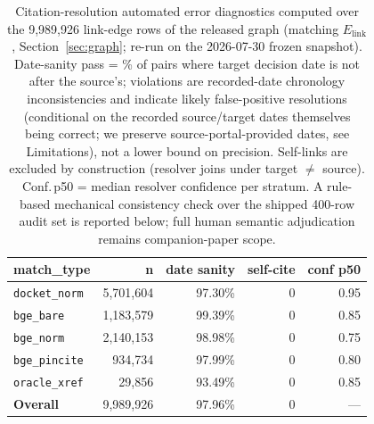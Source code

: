 \begin{table}[H]
\centering
\caption{Citation-resolution automated error diagnostics computed over the 9,989,926 link-edge rows of the released graph (matching $E_{\textrm{link}}$, Section~\ref{sec:graph}; re-run on the 2026-07-30 frozen snapshot). Date-sanity pass = \% of pairs where target decision date is not after the source's; violations are recorded-date chronology inconsistencies and indicate likely false-positive resolutions (conditional on the recorded source/target dates themselves being correct; we preserve source-portal-provided dates, see Limitations), not a lower bound on precision. Self-links are excluded by construction (resolver joins under target $\neq$ source). Conf.\,p50 = median resolver confidence per stratum. A rule-based mechanical consistency check over the shipped 400-row audit set is reported below; full human semantic adjudication remains companion-paper scope.}
\label{tab:precision_proxies}
\small
\begin{tabular}{l r r r r}
\toprule
\textbf{match\_type} & \textbf{n} & \textbf{date sanity} & \textbf{self-cite} & \textbf{conf p50} \\
\midrule
\texttt{docket\_norm} & 5,701,604 & 97.30\% & 0 & 0.95 \\
\texttt{bge\_bare} & 1,183,579 & 99.39\% & 0 & 0.85 \\
\texttt{bge\_norm} & 2,140,153 & 98.98\% & 0 & 0.75 \\
\texttt{bge\_pincite} & 934,734 & 97.99\% & 0 & 0.80 \\
\texttt{oracle\_xref} & 29,856 & 93.49\% & 0 & 0.85 \\
\midrule
\textbf{Overall} & 9,989,926 & 97.96\% & 0 & --- \\
\bottomrule
\end{tabular}
\end{table}
